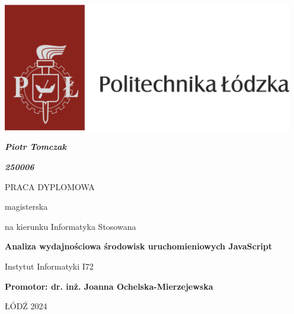 \thispagestyle{empty}

\includegraphics[width=5in]{LogoPL.png}

\begin{centering}

\vspace{1cm}

\textbf{\textit{\large{Piotr Tomczak}}}

\vspace{.1cm}

\textbf{\textit{\large{250006}}}

\vspace{1.5cm}

{\large{PRACA DYPLOMOWA}}

\vspace{.1cm}

{\large{magisterska}}

\vspace{.1cm}
na kierunku Informatyka Stosowana
\vspace{1.8cm}

\textbf{\Large{Analiza wydajnościowa środowisk uruchomieniowych JavaScript}}

\end{centering}

\vspace{3.0cm}
\begin{centering}
{Instytut Informatyki I72}\\
\end{centering}
\vspace{1.0cm}
\textbf{Promotor: dr. inż. Joanna Ochelska-Mierzejewska}

\vfill
\begin{centering}
ŁÓDŹ 2024\\
\end{centering}
